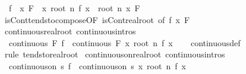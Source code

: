\begin{isabellebody}
\ \ {\isachardoublequoteopen}{\isacharparenleft}{\kern0pt}f\ {\isasymlonglongrightarrow}\ x{\isacharparenright}{\kern0pt}\ F\ {\isasymLongrightarrow}\ {\isacharparenleft}{\kern0pt}{\isacharparenleft}{\kern0pt}{\isasymlambda}x{\isachardot}{\kern0pt}\ root\ n\ {\isacharparenleft}{\kern0pt}f\ x{\isacharparenright}{\kern0pt}{\isacharparenright}{\kern0pt}\ {\isasymlonglongrightarrow}\ root\ n\ x{\isacharparenright}{\kern0pt}\ F{\isachardoublequoteclose}\isanewline
%
\isadelimproof
\ \ %
\endisadelimproof
%
\isatagproof
{}\isamarkupfalse%
\ isCont{\isacharunderscore}{\kern0pt}tendsto{\isacharunderscore}{\kern0pt}compose{\isacharbrackleft}{\kern0pt}OF\ isCont{\isacharunderscore}{\kern0pt}real{\isacharunderscore}{\kern0pt}root{\isacharcomma}{\kern0pt}\ of\ f\ x\ F{\isacharbrackright}{\kern0pt}\ \isacommand{{\isachardot}{\kern0pt}}\isamarkupfalse%
%
\endisatagproof
{\isafoldproof}%
%
\isadelimproof
\isanewline
%
\endisadelimproof
\isanewline
{}\isamarkupfalse%
\ continuous{\isacharunderscore}{\kern0pt}real{\isacharunderscore}{\kern0pt}root\ {\isacharbrackleft}{\kern0pt}continuous{\isacharunderscore}{\kern0pt}intros{\isacharbrackright}{\kern0pt}{\isacharcolon}{\kern0pt}\isanewline
\ \ {\isachardoublequoteopen}continuous\ F\ f\ {\isasymLongrightarrow}\ continuous\ F\ {\isacharparenleft}{\kern0pt}{\isasymlambda}x{\isachardot}{\kern0pt}\ root\ n\ {\isacharparenleft}{\kern0pt}f\ x{\isacharparenright}{\kern0pt}{\isacharparenright}{\kern0pt}{\isachardoublequoteclose}\isanewline
%
\isadelimproof
\ \ %
\endisadelimproof
%
\isatagproof
{}\isamarkupfalse%
\ continuous{\isacharunderscore}{\kern0pt}def\ \isamarkupfalse%
\ {\isacharparenleft}{\kern0pt}rule\ tendsto{\isacharunderscore}{\kern0pt}real{\isacharunderscore}{\kern0pt}root{\isacharparenright}{\kern0pt}%
\endisatagproof
{\isafoldproof}%
%
\isadelimproof
\isanewline
%
\endisadelimproof
\isanewline
{}\isamarkupfalse%
\ continuous{\isacharunderscore}{\kern0pt}on{\isacharunderscore}{\kern0pt}real{\isacharunderscore}{\kern0pt}root\ {\isacharbrackleft}{\kern0pt}continuous{\isacharunderscore}{\kern0pt}intros{\isacharbrackright}{\kern0pt}{\isacharcolon}{\kern0pt}\isanewline
\ \ {\isachardoublequoteopen}continuous{\isacharunderscore}{\kern0pt}on\ s\ f\ {\isasymLongrightarrow}\ continuous{\isacharunderscore}{\kern0pt}on\ s\ {\isacharparenleft}{\kern0pt}{\isasymlambda}x{\isachardot}{\kern0pt}\ root\ n\ {\isacharparenleft}{\kern0pt}f\ x{\isacharparenright}{\kern0pt}{\isacharparenright}{\kern0pt}{\isachardoublequoteclose}\isanewline
%
\isadelimproof

\end{isabellebody}
